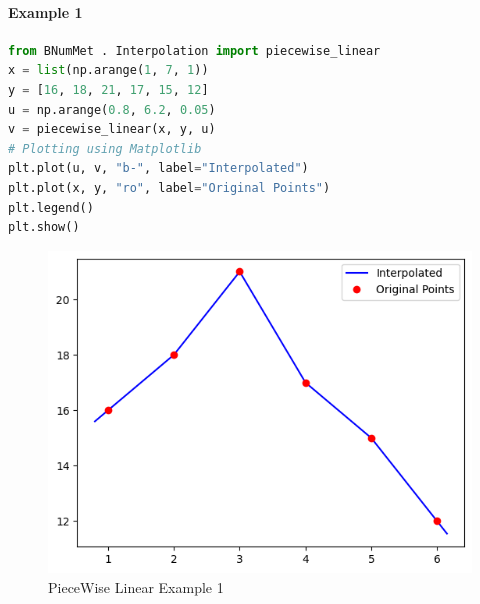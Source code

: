 \paragraph{Example 1}{
\begin{lstlisting}[language=Python]
from BNumMet . Interpolation import piecewise_linear
x = list(np.arange(1, 7, 1))
y = [16, 18, 21, 17, 15, 12]
u = np.arange(0.8, 6.2, 0.05)
v = piecewise_linear(x, y, u)
# Plotting using Matplotlib
plt.plot(u, v, "b-", label="Interpolated")
plt.plot(x, y, "ro", label="Original Points")
plt.legend()
plt.show()
\end{lstlisting}
\begin{figure}[H]
    \centering
    \includegraphics{Include/Images/Thesis/Documentation/Interpolation/PieceWise Linear Example 1.png}
    \caption{PieceWise Linear Example 1}
    \label{fig:PieceWise Linear Example 1}
\end{figure}
}
